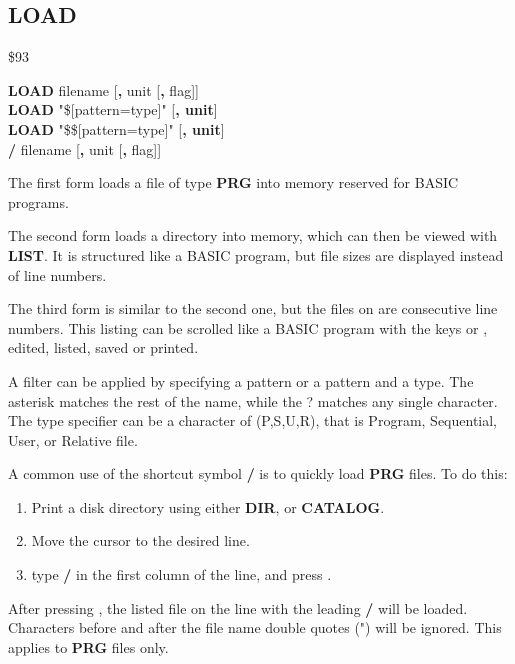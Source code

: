 
\newpage
\subsection{LOAD}
\begin{description}[leftmargin=2cm,style=nextline]
\item [Token:] \$93
\item [Format:] {\bf LOAD} filename [{\bf,} unit [{\bf,} flag]] \\
                {\bf LOAD} "\$[pattern=type]" [{\bf, unit}] \\
                {\bf LOAD} "\$\$[pattern=type]" [{\bf, unit}] \\
                {\bf /} filename [{\bf,} unit [{\bf,} flag]]

\item [Usage:] The first form loads a file of type
   {\bf PRG} into memory reserved for BASIC programs.

The second form loads a directory into memory, which can then be viewed
with {\bf LIST}. It is structured like a BASIC program,
but file sizes are displayed instead of line numbers.

The third form is similar to the second one, but the files on are consecutive
line numbers. This listing can be scrolled like a BASIC program with the keys
 or , edited, listed, saved or printed.

A filter can be applied by specifying a pattern or a pattern and a type.
The asterisk \* matches the rest of the name, while the ? matches any single character.
The type specifier can be a character of (P,S,U,R), that is Program, Sequential, User,
or Relative file.

   A common use of the shortcut symbol {\bf /} is to quickly load
   {\bf PRG} files. To do this:

    \begin{enumerate}
    \item Print a disk directory using either {\bf DIR}, or {\bf CATALOG}.
    \item Move the cursor to the desired line.
    \item type {\bf /} in the first column of the line, and press .
    \end{enumerate}
   After pressing , the listed file on the line
    with the leading {\bf /} will be loaded.
    Characters before and after the file name double quotes (") will be ignored.
   This applies to {\bf PRG} files only.


\end{description}
